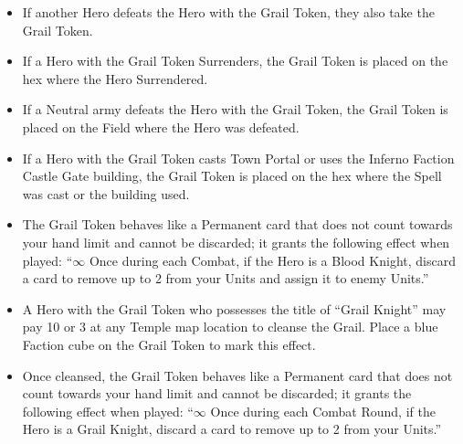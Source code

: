 \begin{multicols*}{2}
\begin{itemize}
  \item If another Hero defeats the Hero with the Grail Token, they also take the Grail Token.
  \item If a Hero with the Grail Token Surrenders, the Grail Token is placed on the hex where the Hero Surrendered.
  \item If a Neutral army defeats the Hero with the Grail Token, the Grail Token is placed on the Field where the Hero was defeated.
  \item If a Hero with the Grail Token casts Town Portal or uses the Inferno Faction Castle Gate building, the Grail Token is placed on the hex where the Spell was cast or the building used.
  \item The Grail Token behaves like a Permanent card that does not count towards your hand limit and cannot be discarded; it grants the following effect when played: ``$\infty$ Once during each Combat, if the Hero is a \textcolor{darkcandyapplered}{Blood Knight}, discard a card to remove up to 2  from your Units and assign it to enemy Units.''
  \item A Hero with the Grail Token who possesses the title of ``\textcolor{cobalt}{Grail Knight}'' may pay 10  or 3  at any Temple map location to cleanse the Grail. Place a blue Faction cube on the Grail Token to mark this effect.
  \item Once cleansed, the Grail Token behaves like a Permanent card that does not count towards your hand limit and cannot be discarded; it grants the following effect when played: ``$\infty$ Once during each Combat Round, if the Hero is a \textcolor{cobalt}{Grail Knight}, discard a card to remove up to 2  from your Units.''
\end{itemize}

\vspace*{\fill}

\begin{center}
\end{center}

\vspace*{\fill}

\end{multicols*}

